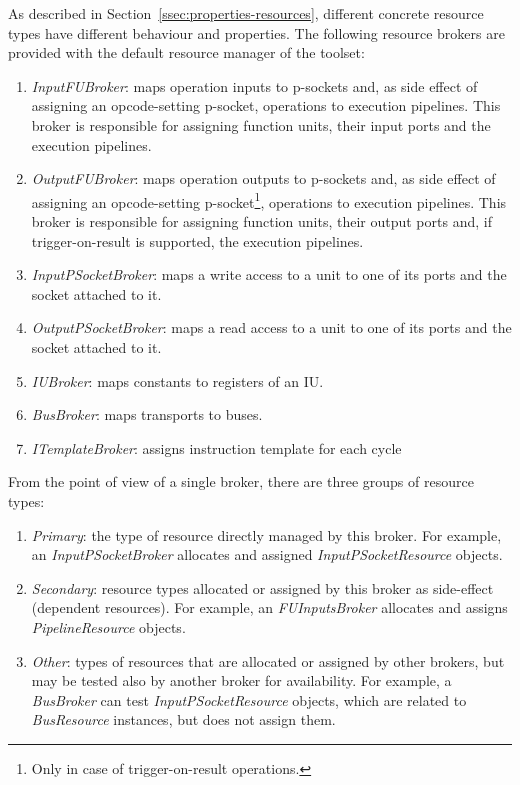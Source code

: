 \documentclass[a4paper,twoside]{tce}
\begin{document}
As described in Section~\ref{ssec:properties-resources}, different concrete
resource types have different behaviour and properties.
%
The following resource brokers are provided with the default resource
manager of the toolset:
\begin{enumerate}
\item%
  \emph{InputFUBroker}: maps operation inputs to p-sockets and, as side
  effect of assigning an opcode-setting p-socket, operations to execution
  pipelines. This broker is responsible for assigning function units,
  their input ports and the execution pipelines.
\item%
  \emph{OutputFUBroker}: maps operation outputs to p-sockets and, as side
  effect of assigning an opcode-setting p-socket\footnote{
%
    Only in case of trigger-on-result operations.},
%
  operations to execution pipelines. This broker is responsible for
  assigning function units, their output ports and, if trigger-on-result is
  supported, the execution pipelines.
\item%
  \emph{InputPSocketBroker}: maps a write access to a unit to one of its
  ports and the socket attached to it.
\item%
  \emph{OutputPSocketBroker}: maps a read access to a unit to one of its
  ports and the socket attached to it.
\item%
  \emph{IUBroker}: maps constants to registers of an IU.
%
\item%
  \emph{BusBroker}: maps transports to buses.
\item%
  \emph{ITemplateBroker}: assigns instruction template for each cycle
\end{enumerate}

From the point of view of a single broker, there are three groups of
resource types:
\begin{enumerate}
\item %
  \emph{Primary}: the type of resource directly managed by this broker. For
  example, an \emph{InputPSocketBroker} allocates and assigned
  \emph{InputPSocketResource} objects.
\item %
  \emph{Secondary}: resource types allocated or assigned by this broker as
  side-effect (dependent resources). For example, an \emph{FUInputsBroker}
  allocates and assigns \emph{PipelineResource} objects.
\item %
  \emph{Other}: types of resources that are allocated or assigned by other
  brokers, but may be tested also by another broker for availability. For
  example, a \emph{BusBroker} can test \emph{InputPSocketResource} objects,
  which are related to \emph{BusResource} instances, but does not assign
  them.
\end{enumerate}
\end{document}
